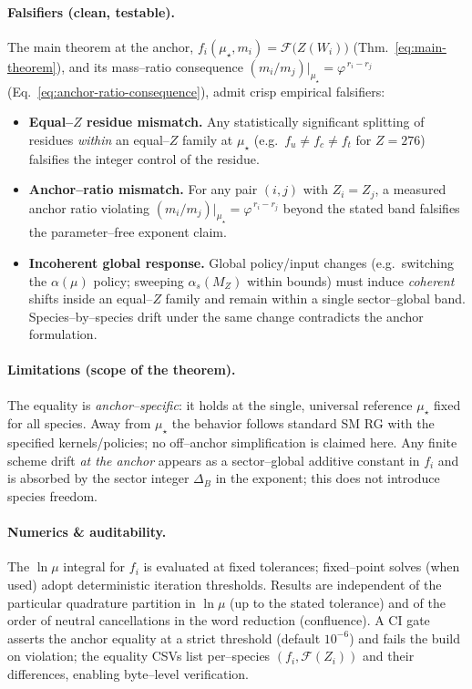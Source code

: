 \documentclass[epjc3]{svjour3}
\begin{document}
\paragraph{Falsifiers (clean, testable).}
The main theorem at the anchor,
\(
  f_i(\mu_\star,m_i)=\mathcal F\!\bigl(Z(W_i)\bigr)
\)
(Thm.~\eqref{eq:main-theorem}), and its mass--ratio consequence
\(
  (m_i/m_j)|_{\mu_\star}=\varphi^{\,r_i-r_j}
\)
(Eq.~\eqref{eq:anchor-ratio-consequence}), admit crisp empirical falsifiers:
\begin{itemize}
  \item \textbf{Equal--$Z$ residue mismatch.} Any statistically significant splitting of residues \emph{within} an equal--$Z$ family at $\mu_\star$ (e.g.\ $f_u\neq f_c\neq f_t$ for $Z=276$) falsifies the integer control of the residue.
  \item \textbf{Anchor--ratio mismatch.} For any pair $(i,j)$ with $Z_i=Z_j$, a measured anchor ratio violating
  \(
    (m_i/m_j)|_{\mu_\star}=\varphi^{\,r_i-r_j}
  \)
  beyond the stated band falsifies the parameter--free exponent claim.
  \item \textbf{Incoherent global response.} Global policy/input changes (e.g.\ switching the $\alpha(\mu)$ policy; sweeping $\alpha_s(M_Z)$ within bounds) must induce \emph{coherent} shifts inside an equal--$Z$ family and remain within a single sector--global band. Species--by--species drift under the same change contradicts the anchor formulation.
\end{itemize}

\paragraph{Limitations (scope of the theorem).}
The equality is \emph{anchor--specific}: it holds at the single, universal reference $\mu_\star$ fixed for all species. Away from $\mu_\star$ the behavior follows standard SM RG with the specified kernels/policies; no off--anchor simplification is claimed here. Any finite scheme drift \emph{at the anchor} appears as a sector--global additive constant in $f_i$ and is absorbed by the sector integer $\Delta_B$ in the exponent; this does not introduce species freedom.

\paragraph{Numerics \& auditability.}
The $\ln\mu$ integral for $f_i$ is evaluated at fixed tolerances; fixed--point solves (when used) adopt deterministic iteration thresholds. Results are independent of the particular quadrature partition in $\ln\mu$ (up to the stated tolerance) and of the order of neutral cancellations in the word reduction (confluence). A CI gate asserts the anchor equality at a strict threshold (default $10^{-6}$) and fails the build on violation; the equality CSVs list per--species $(f_i,\mathcal F(Z_i))$ and their differences, enabling byte--level verification.
\end{document}
